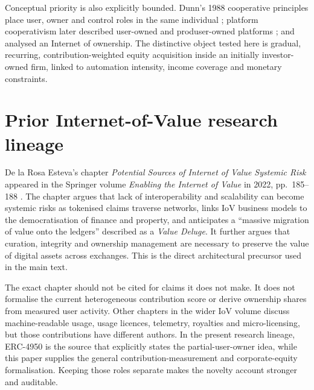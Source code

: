 Conceptual priority is also explicitly bounded. Dunn's 1988 cooperative principles place user, owner and control roles in the same individual \citep{dunn1988}; platform cooperativism later described user-owned and produser-owned platforms \citep{scholz2016}; and \citet{schneider2018} analysed an Internet of ownership. The distinctive object tested here is gradual, recurring, contribution-weighted equity acquisition inside an initially investor-owned firm, linked to automation intensity, income coverage and monetary constraints.

\section{Prior Internet-of-Value research lineage}
De la Rosa Esteva's chapter \emph{Potential Sources of Internet of Value Systemic Risk} appeared in the Springer volume \emph{Enabling the Internet of Value} in 2022, pp.~185--188 \citep{delarosa2022iov}. The chapter argues that lack of interoperability and scalability can become systemic risks as tokenised claims traverse networks, links IoV business models to the democratisation of finance and property, and anticipates a ``massive migration of value onto the ledgers'' described as a \emph{Value Deluge}. It further argues that curation, integrity and ownership management are necessary to preserve the value of digital assets across exchanges. This is the direct architectural precursor used in the main text.

The exact chapter should not be cited for claims it does not make. It does not formalise the current heterogeneous contribution score or derive ownership shares from measured user activity. Other chapters in the wider IoV volume discuss machine-readable usage, usage licences, telemetry, royalties and micro-licensing, but those contributions have different authors. In the present research lineage, ERC-4950 is the source that explicitly states the partial-user-owner idea, while this paper supplies the general contribution-measurement and corporate-equity formalisation. Keeping those roles separate makes the novelty account stronger and auditable.


